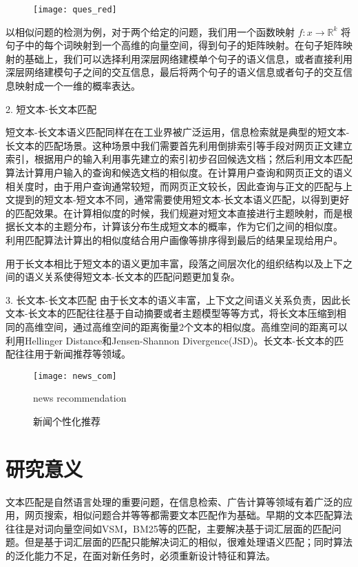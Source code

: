 \begin{figure}[!htbp]
    \centering
    \texttt{[image: ques\_red]}
    \label{fig:ques_red}
\end{figure}

以相似问题的检测为例，对于两个给定的问题，我们用一个函数映射 $f:x\to \mathbb{R}^k$ 将句子中的每个词映射到一个高维的向量空间，得到句子的矩阵映射。在句子矩阵映射的基础上，我们可以选择利用深层网络建模单个句子的语义信息，或者直接利用深层网络建模句子之间的交互信息，最后将两个句子的语义信息或者句子的交互信息映射成一个一维的概率表达。

2. 短文本-长文本匹配

短文本-长文本语义匹配同样在在工业界被广泛运用，信息检索就是典型的短文本-长文本的匹配场景。这种场景中我们需要首先利用倒排索引等手段对网页正文建立索引，根据用户的输入利用事先建立的索引初步召回候选文档；然后利用文本匹配算法计算用户输入的查询和候选文档的相似度。在计算用户查询和网页正文的语义相关度时，由于用户查询通常较短，而网页正文较长，因此查询与正文的匹配与上文提到的短文本-短文本不同，通常需要使用短文本-长文本语义匹配，以得到更好的匹配效果。在计算相似度的时候，我们规避对短文本直接进行主题映射，而是根据长文本的主题分布，计算该分布生成短文本的概率，作为它们之间的相似度。
利用匹配算法计算出的相似度结合用户画像等排序得到最后的结果呈现给用户。

用于长文本相比于短文本的语义更加丰富，段落之间层次化的组织结构以及上下之间的语义关系使得短文本-长文本的匹配问题更加复杂。

3. 长文本-长文本匹配
由于长文本的语义丰富，上下文之间语义关系负责，因此长文本-长文本的匹配往往基于自动摘要或者主题模型等等方式，将长文本压缩到相同的高维空间，通过高维空间的距离衡量2个文本的相似度。高维空间的距离可以利用Hellinger Distance\citep{website:Hellinger}和Jensen-Shannon Divergence(JSD)\citep{website:Shannondivergence}。长文本-长文本的匹配往往用于新闻推荐等领域。

\begin{figure}[!htbp]
  \centering
  \texttt{[image: news\_com]}
  \caption{新闻个性化推荐}{news recommendation}
  \label{fig:news_recom}
\end{figure}

\section{研究意义}
文本匹配是自然语言处理的重要问题，在信息检索、广告计算等领域有着广泛的应用，网页搜索，相似问题合并等等都需要文本匹配作为基础。早期的文本匹配算法往往是对词向量空间如VSM，BM25等的匹配，主要解决基于词汇层面的匹配问题。但是基于词汇层面的匹配只能解决词汇的相似，很难处理语义匹配；同时算法的泛化能力不足，在面对新任务时，必须重新设计特征和算法。

